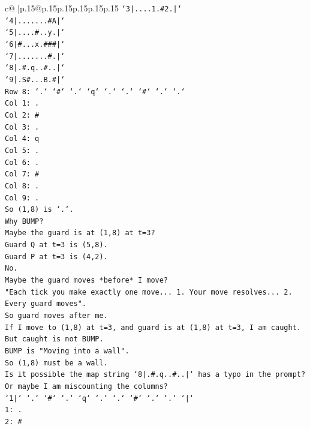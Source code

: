 \documentclass{article}
\begin{document}
{\begin{supertabular}{c@{$\;$}|p{.15\linewidth}@{}p{.15\linewidth}p{.15\linewidth}p{.15\linewidth}p{.15\linewidth}p{.15\linewidth}}
{{{\texttt{`3|....1.\#2.|`} \\
\texttt{`4|.......\#A|`} \\
\texttt{`5|....\#..y.|`} \\
\texttt{`6|\#...x.\#\#\#|`} \\
\texttt{`7|.......\#.|`} \\
\texttt{`8|.\#.q..\#..|`} \\
\texttt{`9|.S\#...B.\#|`} \\
\texttt{Row 8: `.` `\#` `.` `q` `.` `.` `\#` `.` `.`} \\
\texttt{Col 1: .} \\
\texttt{Col 2: \#} \\
\texttt{Col 3: .} \\
\texttt{Col 4: q} \\
\texttt{Col 5: .} \\
\texttt{Col 6: .} \\
\texttt{Col 7: \#} \\
\texttt{Col 8: .} \\
\texttt{Col 9: .} \\
\texttt{So (1,8) is `.`.} \\
\texttt{Why BUMP?} \\
\texttt{Maybe the guard is at (1,8) at t=3?} \\
\texttt{Guard Q at t=3 is (5,8).} \\
\texttt{Guard P at t=3 is (4,2).} \\
\texttt{No.} \\
\texttt{Maybe the guard moves *before* I move?} \\
\texttt{"Each tick you make exactly one move... 1. Your move resolves... 2. Every guard moves".} \\
\texttt{So guard moves after me.} \\
\texttt{If I move to (1,8) at t=3, and guard is at (1,8) at t=3, I am caught.} \\
\texttt{But caught is not BUMP.} \\
\texttt{BUMP is "Moving into a wall".} \\
\texttt{So (1,8) must be a wall.} \\
\texttt{Is it possible the map string `8|.\#.q..\#..|` has a typo in the prompt?} \\
\texttt{Or maybe I am miscounting the columns?} \\
\texttt{`1|` `.` `\#` `.` `q` `.` `.` `\#` `.` `.` `|`} \\
\texttt{1: .} \\
\texttt{2: \#} \\
}}}
\end{supertabular}}
\end{document}
